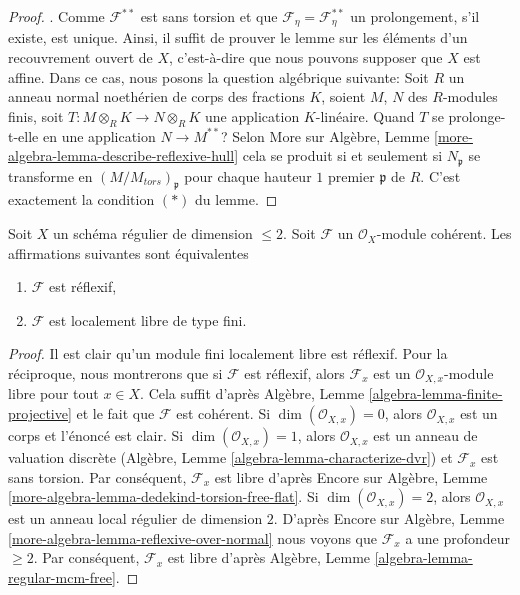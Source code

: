 \begin{proof}
. Comme  $\mathcal{F}^{**}$  est sans torsion et que  $\mathcal{F}_\eta = \mathcal{F}^{**}_\eta$  un prolongement, s'il
existe, est unique. Ainsi, il suffit de prouver le lemme sur les éléments d'un
recouvrement ouvert de  $X$, c'est-à-dire que nous pouvons supposer que
 $X$  est affine. Dans ce cas, nous posons la question algébrique suivante:
Soit  $R$  un anneau normal noethérien de corps des fractions  $K$,
soient  $M$,  $N$  des  $R$-modules finis, soit
 $T : M \otimes_R K \to N \otimes_R K$  une application  $K$-linéaire. Quand  $T$  se
prolonge-t-elle en une application  $N \to M^{**}$? Selon More sur Algèbre, Lemme
 \ref{more-algebra-lemma-describe-reflexive-hull}  cela se produit si et seulement si  $N_\mathfrak p$  se transforme en
 $(M/M_{tors})_\mathfrak p$  pour chaque hauteur  $1$  premier  $\mathfrak p$  de
 $R$. C'est exactement la condition  $(*)$  du lemme.
\end{proof}

\begin{lemma}
\label{lemma-reflexive-over-regular-dim-2}
Soit  $X$  un schéma régulier de dimension  $\leq 2$. Soit  $\mathcal{F}$ 
un  $\mathcal{O}_X$-module cohérent. Les affirmations suivantes sont équivalentes
\begin{enumerate}
\item $\mathcal{F}$  est réflexif,
\item $\mathcal{F}$  est localement libre de type fini.
\end{enumerate}
\end{lemma}

\begin{proof}
Il est clair qu'un module fini localement libre est réflexif. Pour la réciproque,
nous montrerons que si  $\mathcal{F}$  est réflexif, alors  $\mathcal{F}_x$  est un
 $\mathcal{O}_{X, x}$-module libre pour tout  $x \in X$. Cela suffit d'après Algèbre,
Lemme  \ref{algebra-lemma-finite-projective}  et le fait que  $\mathcal{F}$  est cohérent. Si  $\dim(\mathcal{O}_{X, x}) = 0$,
alors  $\mathcal{O}_{X, x}$  est un corps et l'énoncé est clair. Si  $\dim(\mathcal{O}_{X, x}) = 1$, alors
 $\mathcal{O}_{X, x}$  est un anneau de valuation discrète (Algèbre, Lemme  \ref{algebra-lemma-characterize-dvr}) et
 $\mathcal{F}_x$  est sans torsion. Par conséquent,  $\mathcal{F}_x$  est libre d'après
Encore sur Algèbre, Lemme  \ref{more-algebra-lemma-dedekind-torsion-free-flat}. Si  $\dim(\mathcal{O}_{X, x}) = 2$, alors  $\mathcal{O}_{X, x}$  est un
anneau local régulier de dimension  $2$. D'après Encore sur Algèbre, Lemme
 \ref{more-algebra-lemma-reflexive-over-normal}  nous voyons que  $\mathcal{F}_x$  a une profondeur  $\geq 2$. Par
conséquent,  $\mathcal{F}_x$  est libre d'après Algèbre, Lemme  \ref{algebra-lemma-regular-mcm-free}.
\end{proof}







